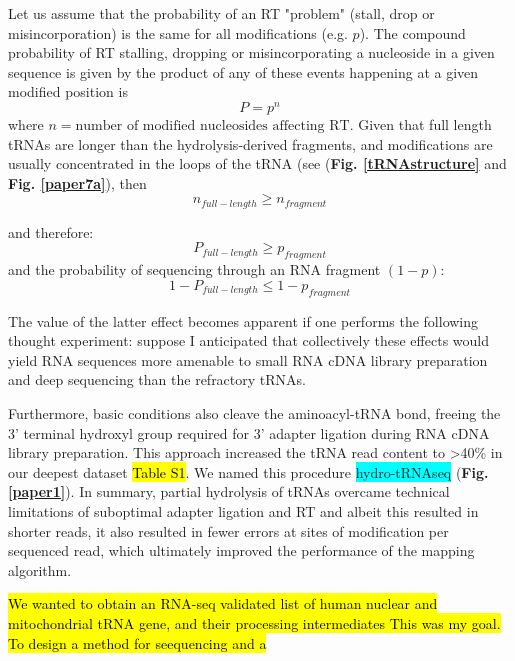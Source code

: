 \documentclass[12pt]{rockefeller}
\newcommand{\cyan}[1]{\colorbox{cyan}{#1}}
\begin{document}
Let us assume that the probability of an RT "problem" (stall, drop or misincorporation) is the same for all modifications (e.g. $p$). The compound probability of RT stalling, dropping or misincorporating a nucleoside in a given sequence is given by the product of any of these events happening at a given modified position is 
\begin{equation}
P = p^n
\end{equation}
where  $n = \text{number of modified nucleosides affecting RT}$. 
Given that full length tRNAs are longer than the hydrolysis-derived fragments, and modifications are usually concentrated in the loops of the tRNA (see (\textbf{Fig. \ref{tRNAstructure}} and \textbf{Fig. \ref{paper7a}}), then 
\begin{equation}
n_{full-length} \geq n_{fragment} 
\end{equation}
\begin{center}
and therefore: 
\begin{equation}
P_{full-length} \geq p_{fragment}
\end{equation}
and the probability of sequencing through an RNA fragment $(1-p)$:
\begin{equation}
1-P_{full-length} \leq 1-p_{fragment}
\end{equation}
\end{center}

The value of the latter effect becomes apparent if one performs the following thought experiment: suppose  I anticipated that collectively these effects would yield RNA sequences more amenable to small RNA cDNA library preparation and deep sequencing than the refractory tRNAs. 

Furthermore, basic conditions also cleave the aminoacyl-tRNA bond, freeing the 3’ terminal hydroxyl group required for 3’ adapter ligation during RNA cDNA library preparation. This approach increased the tRNA read content to >40\% in our deepest dataset \hl{Table S1}. We named this procedure \cyan{hydro-tRNAseq} (\textbf{Fig. \ref{paper1}}).  In summary, partial hydrolysis of tRNAs overcame technical limitations of suboptimal adapter ligation and RT and albeit this resulted in shorter reads, it also resulted in fewer errors at sites of modification per sequenced read, which ultimately improved the performance of the mapping algorithm.

\hl{We wanted to obtain an RNA-seq validated list of human nuclear and mitochondrial tRNA gene, and their processing intermediates
This was my goal. To design a method for seequencing and a}
\end{document}
